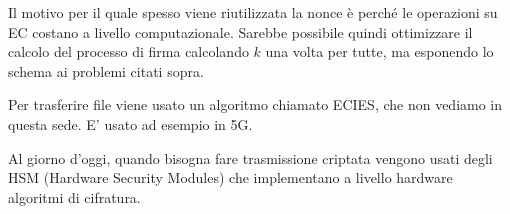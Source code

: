 \begin{remark}
Il motivo per il quale spesso viene riutilizzata la nonce è perché le operazioni su EC costano a livello computazionale. Sarebbe possibile quindi ottimizzare il calcolo del processo di firma calcolando $k$ una volta per tutte, ma esponendo lo schema ai problemi citati sopra.
\end{remark}
\begin{note}
Per trasferire file viene usato un algoritmo chiamato ECIES, che non vediamo in questa sede. E' usato ad esempio in 5G.
\end{note}
\begin{note}
Al giorno d'oggi, quando bisogna fare trasmissione criptata vengono usati degli HSM (Hardware Security Modules) che implementano a livello hardware algoritmi di cifratura.
\end{note}